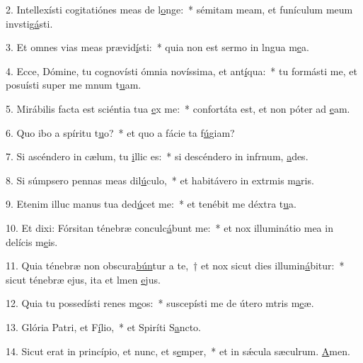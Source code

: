 2. Intellexísti cogitatiónes meas de l\uline{o}nge:~* sémitam meam, et funículum meum invstig\uline{á}sti.\par 
3. Et omnes vias meas prævid\uline{í}sti:~* quia non est sermo in lngua m\uline{e}a.\par 
4. Ecce, Dómine, tu cognovísti ómnia novíssima, et ant\uline{í}qua:~* tu formásti me, et posuísti super me mnum t\uline{u}am.\par 
5. Mirábilis facta est sciéntia tua \uline{e}x me:~* confortáta est, et non póter ad \uline{e}am.\par 
6. Quo ibo a spíritu t\uline{u}o?~* et quo a fácie ta f\uline{ú}giam?\par 
7. Si ascéndero in cælum, tu \uline{i}llic es:~* si descéndero in infrnum, \uline{a}des.\par 
8. Si súmpsero pennas meas dil\uline{ú}culo,~* et habitávero in extrmis m\uline{a}ris.\par 
9. Etenim illuc manus tua ded\uline{ú}cet me:~* et tenébit me déxtra t\uline{u}a.\par 
10. Et dixi: Fórsitan ténebræ conculc\uline{á}bunt me:~* et nox illuminátio mea in delícis m\uline{e}is.\par 
11. Quia ténebræ non obscura\uline{bún}tur a te,~† et nox sicut dies illumin\uline{á}bitur:~* sicut ténebræ ejus, ita et lmen \uline{e}jus.\par 
12. Quia tu possedísti renes m\uline{e}os:~* suscepísti me de útero mtris m\uline{e}æ.\par 
13. Glória Patri, et F\uline{í}lio,~* et Spiríti S\uline{a}ncto.\par 
14. Sicut erat in princípio, et nunc, et s\uline{e}mper,~* et in sǽcula sæculrum. \uline{A}men.\par 

